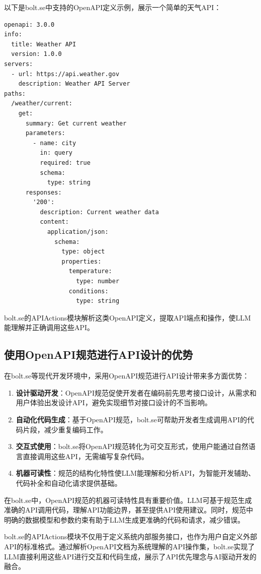 以下是bolt.se中支持的OpenAPI定义示例，展示一个简单的天气API：

\begin{verbatim}
openapi: 3.0.0
info:
  title: Weather API
  version: 1.0.0
servers:
  - url: https://api.weather.gov
    description: Weather API Server
paths:
  /weather/current:
    get:
      summary: Get current weather
      parameters:
        - name: city
          in: query
          required: true
          schema:
            type: string
      responses:
        '200':
          description: Current weather data
          content:
            application/json:
              schema:
                type: object
                properties:
                  temperature:
                    type: number
                  conditions:
                    type: string
\end{verbatim}

bolt.se的APIActions模块解析这类OpenAPI定义，提取API端点和操作，使LLM能理解并正确调用这些API。

\subsection{使用OpenAPI规范进行API设计的优势}
在bolt.se等现代开发环境中，采用OpenAPI规范进行API设计带来多方面优势：

\begin{enumerate}
  \item \textbf{设计驱动开发}：OpenAPI规范促使开发者在编码前先思考接口设计，从需求和用户体验出发设计API，避免实现细节对接口设计的不当影响。
  
  \item \textbf{自动化代码生成}：基于OpenAPI规范，bolt.se可帮助开发者生成调用API的代码片段，减少重复编码工作。
  
  \item \textbf{交互式使用}：bolt.se将OpenAPI规范转化为可交互形式，使用户能通过自然语言直接调用这些API，无需编写复杂代码。
    
  \item \textbf{机器可读性}：规范的结构化特性使LLM能理解和分析API，为智能开发辅助、代码补全和自动化请求提供基础。
\end{enumerate}

在bolt.se中，OpenAPI规范的机器可读特性具有重要价值。LLM可基于规范生成准确的API调用代码，理解API功能边界，甚至提供API使用建议。同时，规范中明确的数据模型和参数约束有助于LLM生成更准确的代码和请求，减少错误。

bolt.se的APIActions模块不仅用于定义系统内部服务接口，也作为用户自定义外部API的标准格式。通过解析OpenAPI文档为系统理解的API操作集，bolt.se实现了LLM直接利用这些API进行交互和代码生成，展示了API优先理念与AI驱动开发的融合。

